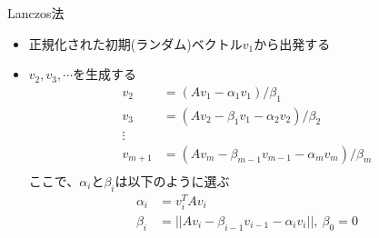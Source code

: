 \begin{frame}[t,fragile]{Lanczos法}
  \begin{itemize}
  \item 正規化された初期(ランダム)ベクトル$v_1$から出発する %
  \item $v_2,v_3,\cdots$を生成する
    \begin{align*}
      v_2 &= (Av_1 - \alpha_1 v_1)/\beta_1 \\
      v_3 &= (Av_2 - \beta_1 v_1 - \alpha_2 v_2)/\beta_2 \\
      \vdots \\
      v_{m+1} &= (Av_m - \beta_{m-1} v_{m-1} - \alpha_m v_m)/\beta_m \\
    \end{align*}
    ここで、$\alpha_i$と$\beta_i$は以下のように選ぶ
    \begin{align*}
      \alpha_i &= v_i^T A v_i \\
      \beta_i &= || A v_i - \beta_{i-1} v_{i-1} - \alpha_i v_i ||, \ \beta_0 = 0
    \end{align*}
  \end{itemize}
\end{frame}
